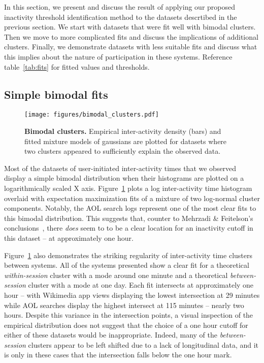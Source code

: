 In this section, we present and discuss the result of applying our proposed inactivity threshold identification method to the datasets descrtibed in the previous section.  We start with datasets that were fit well with bimodal clusters.  Then we move to more complicated fits and discuss the implications of additional clusters.  Finally, we demonstrate datasets with less suitable fits and discuss what this implies about the nature of participation in these systems.  Reference table~\ref{tab:fits} for fitted values and thresholds.

\subsection{Simple bimodal fits}
\begin{figure}
\centering
\texttt{[image: figures/bimodal\_clusters.pdf]}
\caption{
    \textbf{Bimodal clusters.} Empirical inter-activity density (bars) and fitted mixture models of gaussians are plotted for datasets where two clusters appeared to sufficiently explain the observed data.
}
\label{fig:bimodal_clusters}
\end{figure}
Most of the datasets of user-initiated inter-activity times that we observed display a simple bimodal distribution when their histograms are plotted on a logarithmically scaled X axis.  Figure~\ref{fig:bimodal_clusters} plots a log inter-activity time histogram overlaid with expectation maximization fits of a mixture of two log-normal cluster components.  Notably, the AOL search logs represent one of the most clear fits to this bimodal distribution.  This suggests that, counter to Mehrzadi \& Feitelson's conclusions~\cite{mehrzadi2012onextracting}, there \emph{does} seem to to be a clear location for an inactivity cutoff in this dataset -- at approximately one hour.

Figure~\ref{fig:bimodal_clusters} also demonstrates the striking regularity of inter-activity time clusters between systems.  All of the systems presented show a clear fit for a theoretical \emph{within-session} cluster with a mode around one minute and a theoretical \emph{between-session} cluster with a mode at one day.  Each fit intersects at approximately one hour -- with Wikimedia app views displaying the lowest intersection at 29 minutes while AOL searches display the highest intersect at 115 minutes -- nearly two hours.   Despite this variance in the intersection points, a visual inspection of the empirical distribution does not suggest that the choice of a one hour cutoff for either of these datasets would be inappropriate.  Indeed, many of the \emph{between-session} clusters appear to be left shifted due to a lack of longitudinal data, and it is only in these cases that the intersection falls below the one hour mark.

